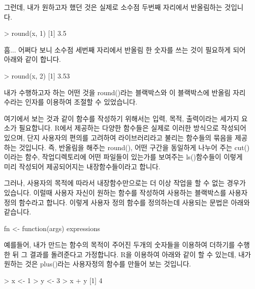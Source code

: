 \documentclass{book}
\begin{document}
그런데, 내가 원하고자 했던 것은 실제로 소수점 두번째 자리에서 반올림하는 것입니다. 

\begin{Schunk}
\begin{Soutput}
> round(x, 1)
[1] 3.5
\end{Soutput}
\end{Schunk}

흠... 어쩌다 보니 소수점 세번째 자리에서 반올림 한 숫자를 쓰는 것이 필요하게 되어 아래와 같이 합니다.

\begin{Schunk}
\begin{Soutput}
> round(x, 2)
[1] 3.53
\end{Soutput}
\end{Schunk}

내가 수행하고자 하는 어떤 것을 round()라는 블랙박스와 이 블랙박스에 반올림 자리수라는 인자를 이용하여 조절할 수 있었습니다. 

여기에서 보는 것과 같이 함수를 작성하기 위해서는 입력, 목적, 출력이라는 세가지 요소가 필요합니다. 
R에서 제공하는 다양한 함수들은 실제로 이러한 방식으로 작성되어 있으며, 단지 사용자의 편의를 고려하여 라이브러리라고 불리는 함수들의 묶음을 제공하는 것입니다. 
즉, 반올림을 해주는 round(), 어떤 구간을 동일하게 나누어 주는 cut()이라는 함수, 작업디렉토리에 어떤 파일들이 있는가를 보여주는 ls()함수들이 이렇게 미리 작성되어 제공되어지는 내장함수들이라고 합니다.

그러나, 사용자의 목적에 따라서 내장함수만으로는 더 이상 작업을 할 수 없는 경우가 있습니다.
이럴때 사용자 자신이 원하는 함수를 작성하여 사용하는 블랙박스를 사용자정의 함수라고 합니다.
이렇게 사용자 정의 함수를 정의하는데 사용되는 문법은 아래와 같습니다. 

\begin{Schunk}
\begin{Soutput}
fn <- function(args){
	expressions
}
\end{Soutput}
\end{Schunk}

예를들어, 내가 만드는 함수의 목적이 주어진 두개의 숫자들을 이용하여 더하기를 수행한 뒤 그 결과를 돌려준다고 가정합니다.
R을 이용하여 아래와 같이 할 수 있는데, 내가 원하는 것은 plus()라는 사용자정의 함수를 만들어 보는 것입니다. 

\begin{Schunk}
\begin{Soutput}
> x <- 1
> y <- 3
> x + y
[1] 4
\end{Soutput}
\end{Schunk}
\end{document}
